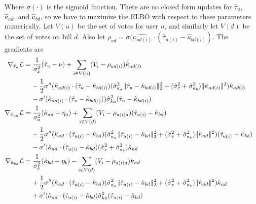 \documentclass{article}
\begin{document}
Where $\sigma(\cdot)$ is the sigmoid function.
\vskip 10pt
 There are no closed form updates for $\hat{\tau}_u$, $\hat{\kappa}_{ad}$, and $\hat{\kappa}_{bd}$, so we have to maximize the ELBO with respect to these parameters numerically. Let $V(u)$ be the set of votes for user $u$, and similarly let $V(d)$ be the set of votes on bill $d$. Also let $\rho_{ud} = \sigma(\hat{\kappa_{ad(i)}} \cdot (\hat{\tau}_{u(i)} - \hat{\kappa}_{bd(i)})$. The gradients are
\begin{align*}
\nabla_{\hat{\tau}_u} \mathcal{L} & = \frac{1}{\sigma^2_x}(\hat{\tau}_u - \nu) + \sum_{i \in V(u)}(V_i - \rho_{ud(i)})\hat{\kappa}_{ad(i)}\\
& \;\;\;\; - \frac{1}{2} \sigma''(\hat{\kappa}_{ad(i)} \cdot (\hat{\tau}_{u} - \hat{\kappa}_{bd(i)})(\hat{\sigma}^2_{\kappa_a} \|\hat{\tau}_{u} - \hat{\kappa}_{bd(i)}\|_2^2 + (\hat{\sigma}^2_{\tau} + \hat{\sigma}^2_{\kappa_b})\|\hat{\kappa}_{ad(i)}\|^2)\hat{\kappa}_{ad(i)}\\
& \;\;\;\; - \sigma'(\hat{\kappa}_{ad(i)} \cdot (\hat{\tau}_{u} - \hat{\kappa}_{bd(i)}))\hat{\sigma}^2_{ka}(\hat{\tau}_u - \hat{\kappa}_{bd(i)})\\
\nabla_{\hat{\kappa}_{ad}} \mathcal{L} & = \frac{1}{\sigma^2_a}(\hat{\kappa}_{ad} - \eta_a) + \sum_{i \in V(d)}(V_i - \rho_{u(i)d})(\hat{\tau}_{u(i)} - \hat{\kappa}_{bd})\\
& \;\;\;\; - \frac{1}{2} \sigma''(\hat{\kappa}_{ad} \cdot (\hat{\tau}_{u(i)} - \hat{\kappa}_{bd})(\hat{\sigma}^2_{\kappa_a} \|\hat{\tau}_{u(i)} - \hat{\kappa}_{bd}\|_2^2 + (\hat{\sigma}^2_{\tau} + \hat{\sigma}^2_{\kappa_b})\|\hat{\kappa}_{ad}\|^2)(\hat{\tau}_{u(i)} - \hat{\kappa}_{bd})\\
& \;\;\;\; - \sigma'(\hat{\kappa}_{ad} \cdot (\hat{\tau}_{u(i)} - \hat{\kappa}_{bd})(\hat{\sigma}^2_{\tau} + \hat{\sigma}^2_{\kappa_b})\hat{\kappa}_{ad}\\
\nabla_{\hat{\kappa}_{bd}} \mathcal{L} & = \frac{1}{\sigma^2_b}(\hat{\kappa}_{bd} - \eta_b) - \sum_{i \in V(d)}(V_i - \rho_{u(i)d})\hat{\kappa}_{ad}\\
& \;\;\;\; + \frac{1}{2} \sigma''(\hat{\kappa}_{ad} \cdot (\hat{\tau}_{u(i)} - \hat{\kappa}_{bd})(\hat{\sigma}^2_{\kappa_a} \|\hat{\tau}_{u(i)} - \hat{\kappa}_{bd}\|_2^2 + (\hat{\sigma}^2_{\tau} + \hat{\sigma}^2_{\kappa_b})\|\hat{\kappa}_{ad}\|^2)\hat{\kappa}_{ad}\\
& \;\;\;\; + \sigma'(\hat{\kappa}_{ad} \cdot (\hat{\tau}_{u(i)} - \hat{\kappa}_{bd})\hat{\sigma}^2_{ka}(\hat{\tau}_{u(i)} - \hat{\kappa}_{bd})
\end{align*}
\end{document}
